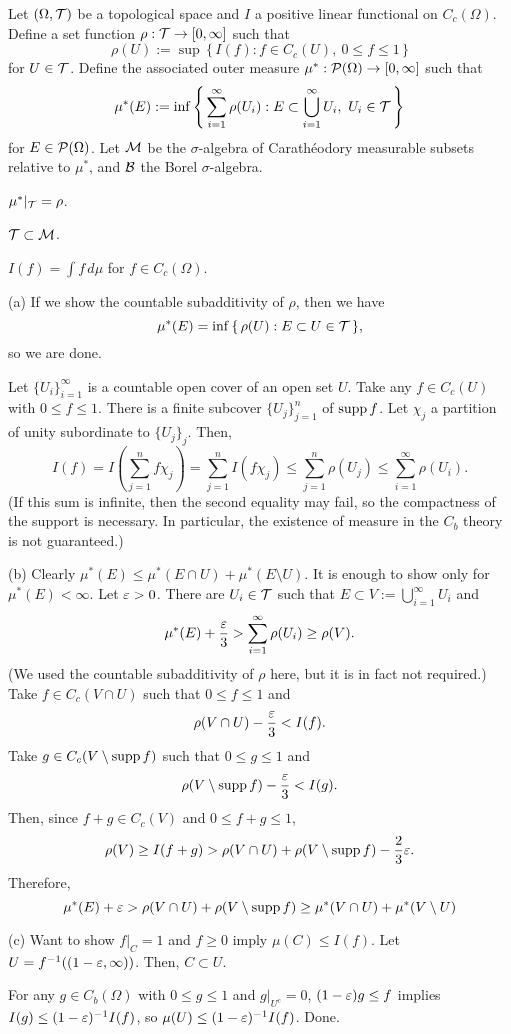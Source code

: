 \documentclass{../note}
\begin{document}
\begin{prb}
Let $(\Omega,\mathcal{T})$ be a topological space and $I$ a positive linear functional on $C_c(\Omega)$.
Define a set function $\rho:\mathcal{T}\to[0,\infty]$ such that
\[\rho(U):=\sup\,\{\,I(f):f\in C_c(U),\ 0\le f\le1\,\}\]
for $U\in\mathcal{T}$.
Define the associated outer measure $\mu^*:\mathcal{P}(\Omega)\to[0,\infty]$ such that
\[\mu^*(E):=\inf\left\{\,\sum_{i=1}^\infty\rho(U_i):E\subset\bigcup_{i=1}^\infty U_i,\ U_i\in\mathcal{T}\,\right\}\]
for $E\in\mathcal{P}(\Omega)$.
Let $\mathcal{M}$ be the $\sigma$-algebra of Carath\'eodory measurable subsets relative to $\mu^*$, and $\mathcal{B}$ the Borel $\sigma$-algebra.
\begin{parts}
\item $\mu^*|_{\mathcal{T}}=\rho$.
\item $\mathcal{T}\subset\mathcal{M}$.
\item $I(f)=\int f\,d\mu$ for $f\in C_c(\Omega)$.
\end{parts}
\end{prb}
\begin{pf}
(a)
If we show the countable subadditivity of $\rho$, then we have
\[\mu^*(E)=\inf\,\{\,\rho(U):E\subset U\in\mathcal{T}\,\},\]
so we are done.

Let $\{U_i\}_{i=1}^\infty$ is a countable open cover of an open set $U$.
Take any $f\in C_c(U)$ with $0\le f\le1$.
There is a finite subcover $\{U_j\}_{j=1}^n$ of $\operatorname{supp} f$.
Let $\chi_j$ a partition of unity subordinate to $\{U_j\}_j$.
Then,
\[I(f)=I\left(\sum_{j=1}^n f\chi_j\right)=\sum_{j=1}^n I(f\chi_j)\le\sum_{j=1}^n\rho(U_j)\le\sum_{i=1}^\infty\rho(U_i).\]
(If this sum is infinite, then the second equality may fail, so the compactness of the support is necessary. In particular, the existence of measure in the $C_b$ theory is not guaranteed.)

(b)
Clearly $\mu^*(E)\le\mu^*(E\cap U)+\mu^*(E\setminus U)$.
It is enough to show only for $\mu^*(E)<\infty$.
Let $\varepsilon>0$.
There are $U_i\in\mathcal{T}$ such that $E\subset V:=\bigcup_{i=1}^\infty U_i$ and
\[\mu^*(E)+\frac{\varepsilon}3>\sum_{i=1}^\infty\rho(U_i)\ge\rho(V).\]
(We used the countable subadditivity of $\rho$ here, but it is in fact not required.)
Take $f\in C_c(V\cap U)$ such that $0\le f\le1$ and
\[\rho(V\cap U)-\frac{\varepsilon}3<I(f).\]
Take $g\in C_c(V\setminus\operatorname{supp} f)$ such that $0\le g\le1$ and
\[\rho(V\setminus\operatorname{supp} f)-\frac{\varepsilon}3<I(g).\]
Then, since $f+g\in C_c(V)$ and $0\le f+g\le1$,
\[\rho(V)\ge I(f+g)>\rho(V\cap U)+\rho(V\setminus\operatorname{supp} f)-\frac23\varepsilon.\]
Therefore,
\[\mu^*(E)+\varepsilon>\rho(V\cap U)+\rho(V\setminus\operatorname{supp} f)\ge\mu^*(V\cap U)+\mu^*(V\setminus U)\]

(c)
Want to show $f|_C=1$ and $f\ge0$ imply $\mu(C)\le I(f)$.
Let $U=f^{-1}((1-\varepsilon,\infty))$.
Then, $C\subset U$.

For any $g\in C_b(\Omega)$ with $0\le g\le1$ and $g|_{U^c}=0$, $(1-\varepsilon)g\le f$ implies $I(g)\le(1-\varepsilon)^{-1}I(f)$, so $\mu(U)\le(1-\varepsilon)^{-1}I(f)$.
Done.
\end{pf}
\end{document}
